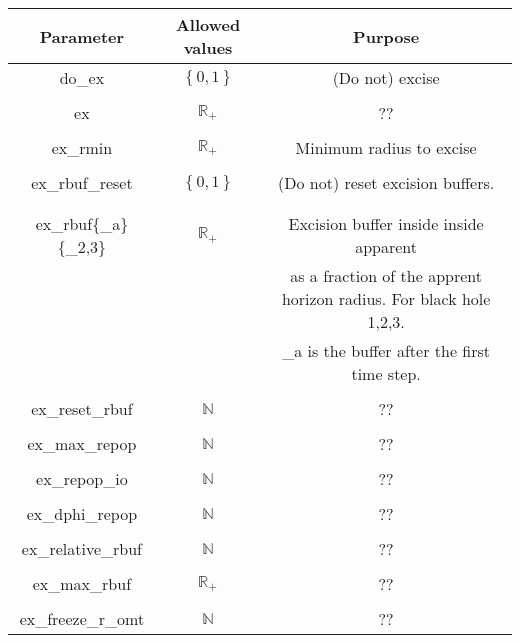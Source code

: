 \documentclass{article}
\begin{document}
\begin{table}[h]
   \centering 
   \begin{tabular}{ccc}
      Parameter  & Allowed values & Purpose \\
      \midrule\midrule
      do\_ex 
      &
      $\left\{0,1\right\}$
      &
      (Do not) excise
      \\ \\
      ex 
      &
      $\mathbb{R}_+$
      &
      ??
      \\ \\
      ex\_rmin 
      & 
      $\mathbb{R}_+$
      &
      Minimum radius to excise
      \\ \\
      ex\_rbuf\_reset
      &
      $\left\{0,1\right\}$
      &
      (Do not) reset excision buffers.
      \\
      \\ \\
      ex\_rbuf\{\_a\}\{\_2,3\}
      &
      $\mathbb{R}_+$
      &
      Excision buffer inside inside apparent
      \\
      & & 
      as a fraction of the apprent horizon radius.
      For black hole 1,2,3.
      \\
      & &
      \_a is the buffer after the first time step.
      \\ \\
      ex\_reset\_rbuf 
      &
      $\mathbb{N}$
      &
      ??
      \\ \\
      ex\_max\_repop 
      &
      $\mathbb{N}$
      &
      ??
      \\ \\
      ex\_repop\_io
      &
      $\mathbb{N}$
      &
      ??
      \\ \\
      ex\_dphi\_repop
      &
      $\mathbb{N}$
      &
      ??
      \\ \\
      ex\_relative\_rbuf
      &
      $\mathbb{N}$
      &
      ??
      \\ \\
      ex\_max\_rbuf
      &
      $\mathbb{R}_+$
      &
      ??
      \\ \\
      ex\_freeze\_r\_omt
      &
      $\mathbb{N}$
      &
      ??
   \end{tabular}
\end{table}
\end{document}

